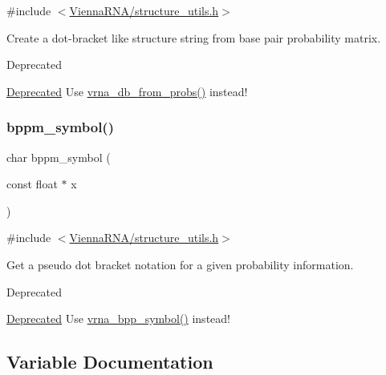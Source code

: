 {\ttfamily \#include $<$\mbox{\hyperlink{structure__utils_8h}{Vienna\+R\+N\+A/structure\+\_\+utils.\+h}}$>$}



Create a dot-\/bracket like structure string from base pair probability matrix. 

\begin{DoxyRefDesc}{Deprecated}
\item[\mbox{\hyperlink{deprecated__deprecated000150}{Deprecated}}]Use \mbox{\hyperlink{group__struct__utils_ga0c28c410a5ab22d6ab9c77a84e8d5b44}{vrna\+\_\+db\+\_\+from\+\_\+probs()}} instead! \end{DoxyRefDesc}
\mbox{\label{group__struct__utils_ga49962ad6242b8c628de6ca16bb831c1d}} 
\subsubsection{\texorpdfstring{bppm\+\_\+symbol()}{bppm\_symbol()}}
{\footnotesize\ttfamily char bppm\+\_\+symbol (\begin{DoxyParamCaption}\item[{const float $\ast$}]{x }\end{DoxyParamCaption})}



{\ttfamily \#include $<$\mbox{\hyperlink{structure__utils_8h}{Vienna\+R\+N\+A/structure\+\_\+utils.\+h}}$>$}



Get a pseudo dot bracket notation for a given probability information. 

\begin{DoxyRefDesc}{Deprecated}
\item[\mbox{\hyperlink{deprecated__deprecated000151}{Deprecated}}]Use \mbox{\hyperlink{group__struct__utils_ga025bff1b27fa46534c8fae6980f64bb5}{vrna\+\_\+bpp\+\_\+symbol()}} instead! \end{DoxyRefDesc}


\subsection{Variable Documentation}
\mbox{\label{group__struct__utils_ga3f31e0e48125601bfa57b52f8b038e8e}} 
